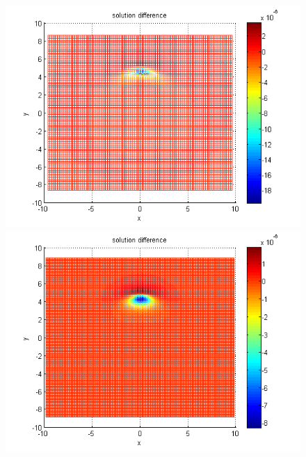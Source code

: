 \documentclass{article}
\begin{document}
\begin{figure}[ht]\vspace{0.4cm}
	\begin{minipage}[b]{0.32\linewidth}
		 \includegraphics[width=\linewidth]{../amitans/figures/compare_30_bt3_c045_h020.png}
	\end{minipage}	
	\begin{minipage}[b]{0.32\linewidth}
		\includegraphics[width=\linewidth]{../amitans/figures/compare_30_bt3_c045_h010.png}
	\end{minipage}	
	\begin{minipage}[b]{0.32\linewidth}		

\end{minipage}
\end{figure}
\end{document}
